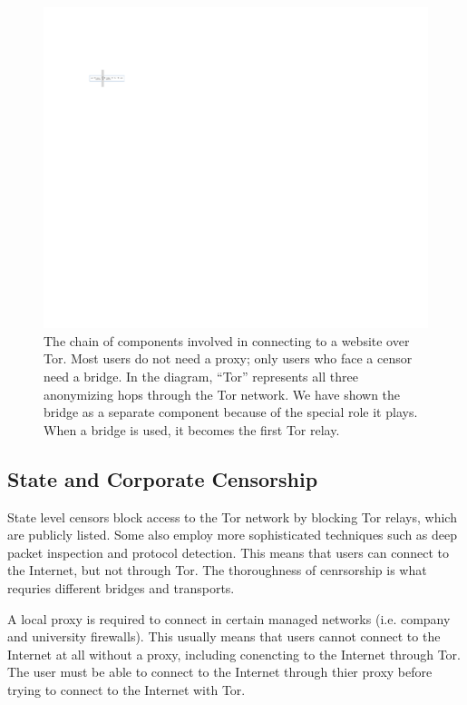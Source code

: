\documentclass[USenglish,oneside,twocolumn]{article}
\begin{document}
\begin{figure}
\centering
\includegraphics{topology.pdf}
\caption{
The chain of components involved in connecting to a website over Tor.
Most users do not need a proxy;
only users who face a censor need a bridge.
In the diagram, ``Tor'' represents all three anonymizing hops through the Tor network.
We have shown the bridge as a separate component
because of the special role it plays.
When a bridge is used, it becomes the first Tor relay.
}
\label{fig:topology}
\end{figure}

\subsection{State and Corporate Censorship}
State level censors block access to the Tor network by blocking Tor relays, which are publicly listed. Some also employ more sophisticated techniques such as deep packet inspection and protocol detection. This means that users can connect to the Internet, but not through Tor. The thoroughness of cenrsorship is what requries different bridges and transports. 

A local proxy is required to connect in certain managed networks (i.e. company and university firewalls). This usually means that users cannot connect to the Internet at all without a proxy, including conencting to the Internet through Tor. The user must be able to connect to the Internet through thier proxy before trying to connect to the Internet with Tor. 
\end{document}
